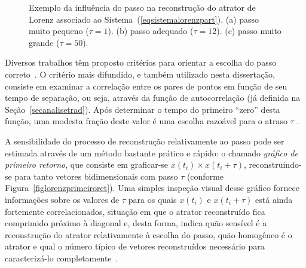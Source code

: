 \begin{figure}[ht]
\caption{Exemplo da influência do passo na reconstrução do atrator de Lorenz associado ao Sistema~(\ref{eqsistemalorenzpart}). (a) passo muito pequeno ($\tau=1$). (b) passo adequado ($\tau=12$). (c) passo muito grande ($\tau=50$).}
\label{figlorenzpasso}
\end{figure}

Diversos trabalhos têm proposto critérios para orientar a escolha do passo correto~\cite{fraswi/86}. O critério mais difundido, e também utilizado nesta dissertação, consiste em examinar a correlação entre os pares de pontos em função de seu tempo de separação, ou seja, através da função de autocorrelação (já definida na Seção~\ref{secanalisetrad}). Após determinar o tempo do primeiro ``zero'' desta função, uma modesta fração deste valor é uma escolha razoável para o atraso $\tau$ \cite{gollub/98}.

A sensibilidade do processo de reconstrução relativamente ao passo pode ser estimada através de um método bastante prático e rápido: o chamado \textit{gráfico de primeiro retorno}, que consiste em graficar-se $x(t_{i})\times x(t_{i}+\tau)$, reconstruindo-se para tanto vetores bidimensionais com passo $\tau$ (conforme Figura~\ref{figlorenzprimeiroret}). Uma simples inspeção visual desse gráfico fornece informações sobre os valores de $\tau$ para os quais $x(t_{i})$ e $x(t_{i}+\tau)$ está ainda fortemente correlacionados, situação em que o atrator reconstruído fica comprimido próximo à diagonal e, desta forma, indica quão sensível é a reconstrução do atrator relativamente à escolha do passo, quão homogêneo é o atrator e qual o número típico de vetores reconstruídos necessário para caracterizá-lo completamente~\cite{monteiro/02}. 

